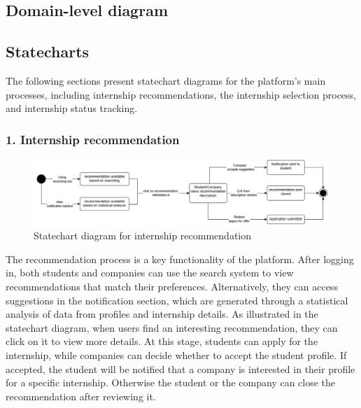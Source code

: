 \subsection{Domain-level diagram}\label{subsec:domain_level_diagram}

\subsection{Statecharts}\label{subsec:statecharts}
The following sections present statechart diagrams for the platform's main processes, including internship recommendations, the internship 
selection process, and internship status tracking. 

\subsubsection{1. Internship recommendation}\label{subsubsec:internship_application}
\begin{figure}[H]
    \centering
    \includegraphics[width=1\textwidth]{Images/Internship_recommendation.png}
    \caption{Statechart diagram for internship recommendation}\label{fig:statechart_internship_recommendation}
\end{figure}
The recommendation process is a key functionality of the platform. After logging in, both students and companies can use the search system to view 
recommendations that match their preferences. Alternatively, they can access suggestions in the notification section, which are generated through
a statistical analysis of data from profiles and internship details. As illustrated in the statechart diagram, when users find an interesting 
recommendation, they can click on it to view more details. At this stage, students can apply for the internship, while companies can decide whether
to accept the student profile. If accepted, the student will be notified that a company is interested in their profile for a specific internship. 
Otherwise the student or the company can close the recommendation after reviewing it.

